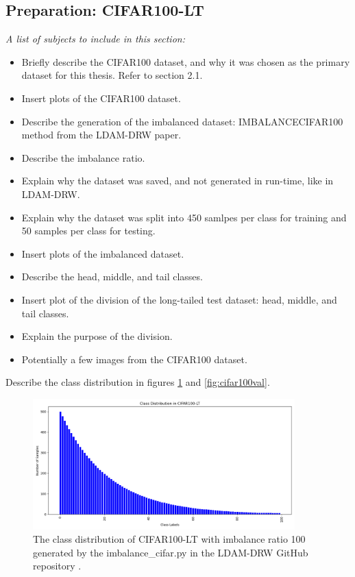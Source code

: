 \subsection{Preparation: CIFAR100-LT}
\textit{A list of subjects to include in this section:}

\begin{itemize}
    \item Briefly describe the CIFAR100 dataset, and why it was chosen as the primary dataset for this thesis. Refer to section 2.1.
    \item Insert plots of the CIFAR100 dataset.
    \item Describe the generation of the imbalanced dataset: IMBALANCECIFAR100 method from the LDAM-DRW paper.
    \item Describe the imbalance ratio.
    \item Explain why the dataset was saved, and not generated in run-time, like in LDAM-DRW.
    \item Explain why the dataset was split into 450 samlpes per class for training and 50 samples per class for testing.
    \item Insert plots of the imbalanced dataset.
    \item Describe the head, middle, and tail classes.
    \item Insert plot of the division of the long-tailed test dataset: head, middle, and tail classes.
    \item Explain the purpose of the division.
    \item Potentially a few images from the CIFAR100 dataset.
\end{itemize}

Describe the class distribution in figures \ref{fig:cifar100_imbalance_cifar} and \ref{fig:cifar100val}.

\begin{figure}[H]
    \centering
    \includegraphics[width=0.9\textwidth]{Images/Plots/Class Distribution for CIFAR100-LT.png}
    \caption{The class distribution of CIFAR100-LT with imbalance ratio 100 generated by the imbalance\_cifar.py in the LDAM-DRW GitHub repository \cite{kaidic_ldam_drw}.}
    \label{fig:cifar100_imbalance_cifar}
\end{figure}

